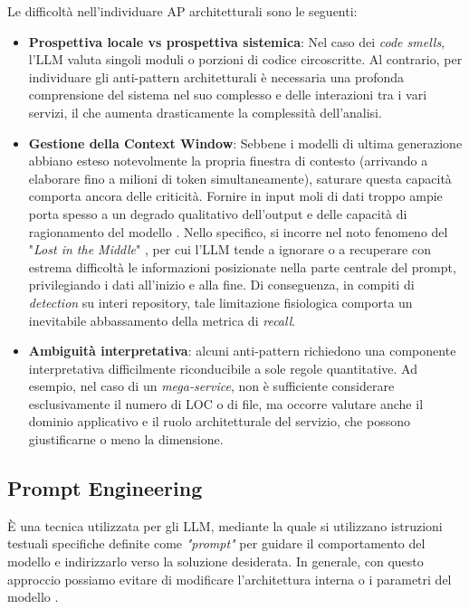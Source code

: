 Le difficoltà nell'individuare AP architetturali sono le seguenti:
\begin{itemize}
    \item \textbf{Prospettiva locale vs prospettiva sistemica}: Nel caso dei \textit{code smells}, l'LLM valuta singoli moduli o porzioni di codice circoscritte. Al contrario, per individuare gli anti-pattern architetturali è necessaria una profonda comprensione del sistema nel suo complesso e delle interazioni tra i vari servizi, il che aumenta drasticamente la complessità dell'analisi.
    \item \textbf{Gestione della Context Window}: Sebbene i modelli di ultima generazione abbiano esteso notevolmente la propria finestra di contesto (arrivando a elaborare fino a milioni di token simultaneamente), saturare questa capacità comporta ancora delle criticità. Fornire in input moli di dati troppo ampie porta spesso a un degrado qualitativo dell'output e delle capacità di ragionamento del modello \cite{contextwindows_llm}. Nello specifico, si incorre nel noto fenomeno del "\textit{Lost in the Middle}" \cite{contextwindows_llm}, per cui l'LLM tende a ignorare o a recuperare con estrema difficoltà le informazioni posizionate nella parte centrale del prompt, privilegiando i dati all'inizio e alla fine.
    Di conseguenza, in compiti di \textit{detection} su interi repository, tale limitazione fisiologica comporta un inevitabile abbassamento della metrica di \textit{recall}.

    \item \textbf{Ambiguità interpretativa}: alcuni anti-pattern richiedono una componente interpretativa difficilmente riconducibile a sole regole quantitative. Ad esempio, nel caso di un \textit{mega-service}, non è sufficiente considerare esclusivamente il numero di LOC o di file, ma occorre valutare anche il dominio applicativo e il ruolo architetturale del servizio, che possono giustificarne o meno la dimensione.
\end{itemize}



\subsection{Prompt Engineering}
\label{sec:prompteng}
È una tecnica utilizzata per gli LLM, mediante la quale si utilizzano istruzioni testuali specifiche definite come \textit{"prompt"} per guidare il comportamento del modello e indirizzarlo verso la soluzione desiderata. In generale, con questo approccio possiamo evitare di modificare l'architettura interna o i parametri del modello \cite{prompteng}.

